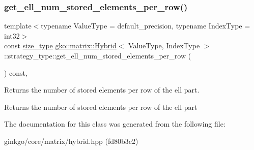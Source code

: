 \subsubsection{\texorpdfstring{get\+\_\+ell\+\_\+num\+\_\+stored\+\_\+elements\+\_\+per\+\_\+row()}{get\_ell\_num\_stored\_elements\_per\_row()}}
{\footnotesize\ttfamily template$<$typename Value\+Type = default\+\_\+precision, typename Index\+Type = int32$>$ \\
const \hyperlink{namespacegko_a6e5c95df0ae4e47aab2f604a22d98ee7}{size\+\_\+type} \hyperlink{classgko_1_1matrix_1_1Hybrid}{gko\+::matrix\+::\+Hybrid}$<$ Value\+Type, Index\+Type $>$\+::strategy\+\_\+type\+::get\+\_\+ell\+\_\+num\+\_\+stored\+\_\+elements\+\_\+per\+\_\+row (\begin{DoxyParamCaption}{ }\end{DoxyParamCaption}) const\hspace{0.3cm}{\ttfamily [inline]}, {\ttfamily [noexcept]}}



Returns the number of stored elements per row of the ell part. 

\begin{DoxyReturn}{Returns}
the number of stored elements per row of the ell part 
\end{DoxyReturn}


The documentation for this class was generated from the following file\+:\begin{DoxyCompactItemize}
\item 
ginkgo/core/matrix/hybrid.\+hpp (fd80b3c2)\end{DoxyCompactItemize}
